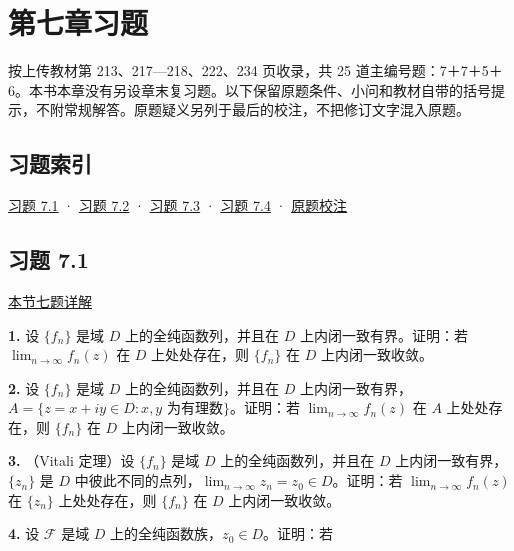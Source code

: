 \documentclass[11pt,a4paper]{article}
\begin{document}
\clearpage\section*{第七章习题}
按上传教材第 213、217---218、222、234 页收录，共 25
道主编号题：7＋7＋5＋6。本书本章没有另设章末复习题。以下保留原题条件、小问和教材自带的括号提示，不附常规解答。原题疑义另列于最后的校注，不把修订文字混入原题。

\subsection*{习题索引}\label{ch07-practice-heading-1}

\hyperref[ch07-practice-heading-2]{习题 7.1} · \hyperref[ch07-practice-heading-3]{习题 7.2} ·
\hyperref[ch07-practice-heading-4]{习题 7.3} · \hyperref[ch07-practice-heading-5]{习题 7.4} ·
\hyperref[ch07-practice-heading-6]{原题校注}

\subsection{习题 7.1}\label{ch07-practice-heading-2}

\hyperref[ch07-s1-heading-9]{本节七题详解}

\par{}
\noindent\textbf{1.} 设 \(\{f_n\}\) 是域 \(D\) 上的全纯函数列，并且在 \(D\)
上内闭一致有界。证明：若 \(\lim_{n\to\infty}f_n(z)\) 在 \(D\)
上处处存在，则 \(\{f_n\}\) 在 \(D\) 上内闭一致收敛。

\par{}
\noindent\textbf{2.} 设 \(\{f_n\}\) 是域 \(D\) 上的全纯函数列，并且在 \(D\)
上内闭一致有界，\(A=\{z=x+iy\in D:x,y\text{ 为有理数}\}\)。证明：若
\(\lim_{n\to\infty}f_n(z)\) 在 \(A\) 上处处存在，则 \(\{f_n\}\) 在 \(D\)
上内闭一致收敛。

\par{}
\noindent\textbf{3.} （Vitali 定理）设 \(\{f_n\}\) 是域 \(D\)
上的全纯函数列，并且在 \(D\) 上内闭一致有界，\(\{z_n\}\) 是 \(D\)
中彼此不同的点列，\(\lim_{n\to\infty}z_n=z_0\in D\)。证明：若
\(\lim_{n\to\infty}f_n(z)\) 在 \(\{z_n\}\) 上处处存在，则 \(\{f_n\}\) 在
\(D\) 上内闭一致收敛。

\par{}
\noindent\textbf{4.} 设 \(\mathcal F\) 是域 \(D\)
上的全纯函数族，\(z_0\in D\)。证明：若
\end{document}
